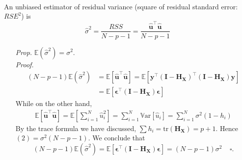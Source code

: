 \documentclass[a4paper, 11pt]{article}
\begin{document}
~\\
An unbiased estimator of residual variance (square of residual standard error: $RSE^2$) is
$$
\hat{\sigma}^2 = \frac{RSS}{N-p-1} = \frac{\hat{\bm{u}}^{\top} \hat{\bm{u}}}{N-p-1}
$$
\begin{itemize}
	\item[\textit{Prop.}] $\mathbb{E}(\hat{\sigma}^2) = \sigma^2$. \\
	\textit{Proof.~~} 
	\begin{equation}
		\begin{split}
			(N-p-1)\mathbb{E}(\hat{\sigma}^2) &= \mathbb{E}\left[\hat{\bm{u}}^{\top} \hat{\bm{u}}\right] = \mathbb{E}\left[\bm{y}^{\top} (\bm{I}-\bm{H}_{\bm{X}})^{\top}(\bm{I}-\bm{H}_{\bm{X}})\bm{y}\right] \\
			&= \mathbb{E}\left[\bm{\epsilon}^{\top}(\bm{I}-\bm{H}_{\bm{X}})\bm{\epsilon}\right]
		\end{split}
	\end{equation}
	While on the other hand, 
	\begin{equation}
		\begin{split}
			\mathbb{E}\left[\hat{\bm{u}}^{\top} \hat{\bm{u}}\right] = \mathbb{E}\left[\sum_{i=1}^N \hat{u}_i^2\right] = \sum_{i=1}^N \mathrm{\mathbb{V}ar}\left[\hat{u}_i\right] = \sum_{i=1}^N \sigma^2(1-h_i)
		\end{split}
	\end{equation}
	By the trace formula we have discussed, $\sum{h_i} = \text{tr}(\bm{H}_{\bm{X}}) = p+1$. Hence $(2)=\sigma^2(N-p-1)$. We conclude that 
	$$
	(N-p-1)\mathbb{E}(\hat{\sigma}^2) = \mathbb{E}\left[\bm{\epsilon}^{\top}(\bm{I}-\bm{H}_{\bm{X}})\bm{\epsilon}\right] = (N-p-1)\sigma^2~~~~~\square.
	$$
\end{itemize}
\end{document}
